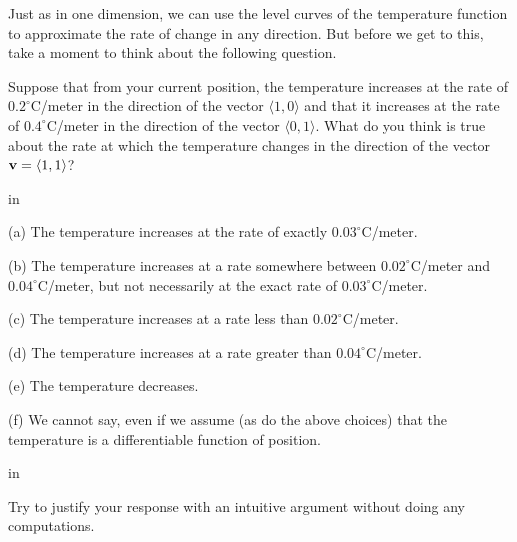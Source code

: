 \documentclass{ximera}
\newcommand{\pskip}{\vskip 0.1 in}
\begin{document}
Just as in one dimension, we can use the level curves of the temperature function to approximate the rate of change in any direction. But before we get to this, take a moment to think about the following question.

\begin{question}  \label{Qwerder432}
Suppose that from your current position, the temperature increases at the rate of $0.2^\circ$C/meter in the direction of the vector $\langle 1, 0 \rangle$ and that it increases at the rate of $0.4^\circ$C/meter in the direction of the vector $\langle 0,1\rangle$. What do you think is true about the rate at which the temperature changes in the direction of the vector ${\bf v} = \langle 1,1\rangle$?

\pskip

(a) The temperature increases at the rate of exactly $0.03^\circ$C/meter.

(b) The temperature increases at a rate somewhere between $0.02^\circ$C/meter and $0.04^\circ$C/meter, but not necessarily at the exact rate of $0.03^\circ$C/meter.

(c) The temperature increases at a rate less than $0.02^\circ$C/meter.

(d) The temperature increases at a rate greater than $0.04^\circ$C/meter.

(e) The temperature decreases.

(f) We cannot say, even if we assume (as do the above choices) that the temperature is a differentiable function of position.

\pskip

Try to justify your response with an intuitive argument without doing any computations.


\end{question}
\end{document}
